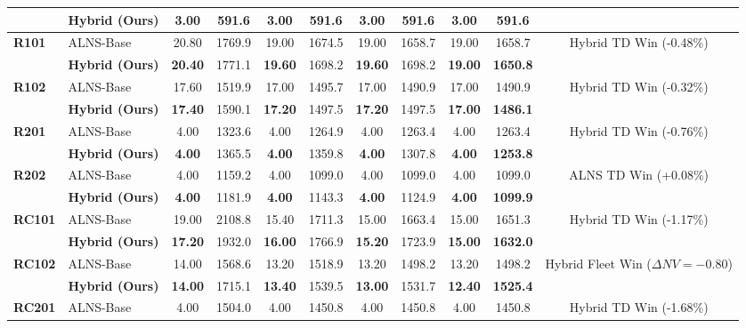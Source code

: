 \documentclass{article}
\begin{document}
\begin{table}[!htbp]
\begin{tabular*}{\textwidth}{@{\extracolsep{\fill}} ll cccccc cc c @{}}
 & \textbf{Hybrid (Ours)} & \textbf{3.00} & 591.6 & \textbf{3.00} & 591.6 & \textbf{3.00} & 591.6 & \textbf{3.00} & \textbf{591.6} & \\
\midrule
\multirow{2}{*}{\textbf{R101}} & ALNS-Base & 20.80 & 1769.9 & 19.00 & 1674.5 & 19.00 & 1658.7 & 19.00 & 1658.7 & \multirow{2}{*}{Hybrid TD Win (-0.48\%)} \\
 & \textbf{Hybrid (Ours)} & \textbf{20.40} & 1771.1 & \textbf{19.60} & 1698.2 & \textbf{19.60} & 1698.2 & \textbf{19.00} & \textbf{1650.8} & \\
\midrule
\multirow{2}{*}{\textbf{R102}} & ALNS-Base & 17.60 & 1519.9 & 17.00 & 1495.7 & 17.00 & 1490.9 & 17.00 & 1490.9 & \multirow{2}{*}{Hybrid TD Win (-0.32\%)} \\
 & \textbf{Hybrid (Ours)} & \textbf{17.40} & 1590.1 & \textbf{17.20} & 1497.5 & \textbf{17.20} & 1497.5 & \textbf{17.00} & \textbf{1486.1} & \\
\midrule
\multirow{2}{*}{\textbf{R201}} & ALNS-Base & 4.00 & 1323.6 & 4.00 & 1264.9 & 4.00 & 1263.4 & 4.00 & 1263.4 & \multirow{2}{*}{Hybrid TD Win (-0.76\%)} \\
 & \textbf{Hybrid (Ours)} & \textbf{4.00} & 1365.5 & \textbf{4.00} & 1359.8 & \textbf{4.00} & 1307.8 & \textbf{4.00} & \textbf{1253.8} & \\
\midrule
\multirow{2}{*}{\textbf{R202}} & ALNS-Base & 4.00 & 1159.2 & 4.00 & 1099.0 & 4.00 & 1099.0 & 4.00 & 1099.0 & \multirow{2}{*}{ALNS TD Win (+0.08\%)} \\
 & \textbf{Hybrid (Ours)} & \textbf{4.00} & 1181.9 & \textbf{4.00} & 1143.3 & \textbf{4.00} & 1124.9 & \textbf{4.00} & \textbf{1099.9} & \\
\midrule
\multirow{2}{*}{\textbf{RC101}} & ALNS-Base & 19.00 & 2108.8 & 15.40 & 1711.3 & 15.00 & 1663.4 & 15.00 & 1651.3 & \multirow{2}{*}{Hybrid TD Win (-1.17\%)} \\
 & \textbf{Hybrid (Ours)} & \textbf{17.20} & 1932.0 & \textbf{16.00} & 1766.9 & \textbf{15.20} & 1723.9 & \textbf{15.00} & \textbf{1632.0} & \\
\midrule
\multirow{2}{*}{\textbf{RC102}} & ALNS-Base & 14.00 & 1568.6 & 13.20 & 1518.9 & 13.20 & 1498.2 & 13.20 & 1498.2 & \multirow{2}{*}{Hybrid Fleet Win ($\Delta NV=-0.80$)} \\
 & \textbf{Hybrid (Ours)} & \textbf{14.00} & 1715.1 & \textbf{13.40} & 1539.5 & \textbf{13.00} & 1531.7 & \textbf{12.40} & \textbf{1525.4} & \\
\midrule
\multirow{2}{*}{\textbf{RC201}} & ALNS-Base & 4.00 & 1504.0 & 4.00 & 1450.8 & 4.00 & 1450.8 & 4.00 & 1450.8 & \multirow{2}{*}{Hybrid TD Win (-1.68\%)} \\

\end{tabular*}
\end{table}
\end{document}
